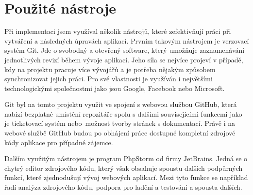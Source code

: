 \section{Použité nástroje}
Při implementaci jsem využíval několik nástrojů, které zefektivňují práci při vytváření a následných úpravách aplikací. Prvním takovým nástrojem je verzovací systém Git. Jde o svobodný a otevřený software, který umožňuje zaznamenávání jednotlivých revizí během vývoje aplikací. Jeho síla se nejvíce projeví v případě, kdy na projektu pracuje více vývojářů a je potřeba nějakým způsobem synchronizovat jejich práci. Pro své vlastnosti je využíván i největšími technologickými společnostmi jako jsou Google, Facebook nebo Microsoft. \cite{git}

Git byl na tomto projektu využit ve spojení s webovou službou GitHub, která nabízí bezplatné umístění repozitáře spolu s dalšími souvisejícími funkcemi jako je ticketovací systém nebo~možnost tvorby  stránek s dokumentací. Právě i na webové službě GitHub budou po obhájení práce dostupné kompletní zdrojové kódy aplikace pro případné zájemce.

Dalším využitým nástrojem je program PhpStorm od firmy JetBrains. Jedná se o chytrý editor zdrojového kódu, který však obsahuje spoustu dalších podpůrných funkcí, které zjednodušují vývoj webových aplikací. Mezi tyto funkce se například řadí analýza zdrojového kódu, podpora pro ladění a testování a spousta dalších.
